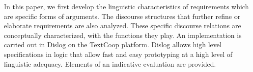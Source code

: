 In this paper, we first develop the linguistic characteristics of requirements which are specific forms of arguments. The discourse structures that further refine or elaborate requirements are also analyzed. These specific discourse relations are conceptually characterized, with the functions they play. An implementation is carried out in Dislog on the TextCoop platform. Dislog allows high level specifications in logic that allow fast and easy prototyping at a high level of linguistic adequacy. Elements of an indicative evaluation are provided.
